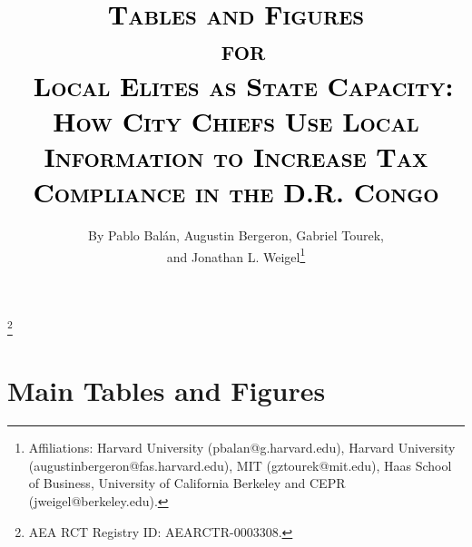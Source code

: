 \documentclass[12pt,english]{article}
\begin{document}

\sloppy

\title{\textcolor{black}{\textsc{Tables and Figures \\\ for \\\ Local Elites as State Capacity}:}\\
\textcolor{black}{\textsc{\Large{How City Chiefs Use Local Information to Increase Tax Compliance in the D.R. Congo}}}
\textcolor{black}{\textbf{\Huge{}}}
}\thanks{\scriptsize{AEA RCT Registry ID: AEARCTR-0003308.}}

\author{By Pablo Bal\'an, Augustin Bergeron, Gabriel Tourek, \\ and Jonathan L. Weigel\thanks{\scriptsize Affiliations: Harvard University (pbalan@g.harvard.edu), Harvard University (augustinbergeron@fas.harvard.edu), MIT (gztourek@mit.edu), Haas School of Business, University of California Berkeley and CEPR (jweigel@berkeley.edu).}}

\maketitle

\addtocounter{page}{-2}

\singlespacing


 
\thispagestyle{empty}
 
 

\onehalfspacing
\normalsize

\section{Main Tables and Figures}
\end{document}
